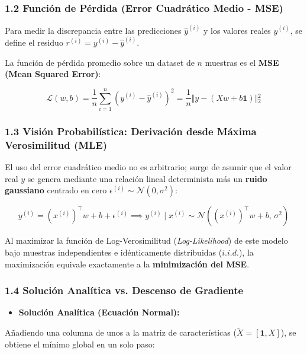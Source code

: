 \documentclass[11pt,oneside]{article}
\begin{document}
\subsubsection{1.2 Función de Pérdida (Error Cuadrático Medio - MSE)}

Para medir la discrepancia entre las predicciones \(\hat{y}^{(i)}\) y los valores reales \(y^{(i)}\), se define el residuo \(r^{(i)} = y^{(i)} - \hat{y}^{(i)}\).

La función de pérdida promedio sobre un dataset de \(n\) muestras es el \textbf{MSE (Mean Squared Error)}:

\[\mathcal{L}(w, b) = \frac{1}{n} \sum_{i=1}^{n} \left(y^{(i)} - \hat{y}^{(i)}\right)^2 = \frac{1}{n} \Vert{} y - (Xw + b\mathbf{1}) \Vert{}_2^2\]

\subsubsection{1.3 Visión Probabilística: Derivación desde Máxima Verosimilitud (MLE)}

El uso del error cuadrático medio no es arbitrario; surge de asumir que el valor real \(y\) se genera mediante una relación lineal determinista más un \textbf{ruido gaussiano} centrado en cero \(\epsilon^{(i)} \sim \mathcal{N}(0, \sigma^2)\):

\[y^{(i)} = (x^{(i)})^\top w + b + \epsilon^{(i)} \implies y^{(i)} \mid x^{(i)} \sim \mathcal{N}\left((x^{(i)})^\top w + b, \, \sigma^2\right)\]

Al maximizar la función de Log-Verosimilitud (\emph{Log-Likelihood}) de este modelo bajo muestras independientes e idénticamente distribuidas (\(i.i.d.\)), la maximización equivale exactamente a la \textbf{minimización del MSE}.

\subsubsection{1.4 Solución Analítica vs. Descenso de Gradiente}

\begin{itemize}

\item \textbf{Solución Analítica (Ecuación Normal):}

\end{itemize}

  Añadiendo una columna de unos a la matriz de características (\(\tilde{X} = [\mathbf{1}, X]\)), se obtiene el mínimo global en un solo paso:
\end{document}
